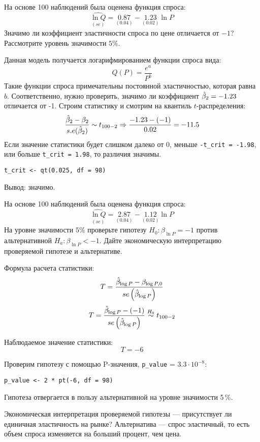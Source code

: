 \begin{problem} На основе 100 наблюдений была оценена функция спроса:
\[
\underset{(se)}{\widehat{\ln Q}} = \underset{(0.04)}{0.87} - \underset{(0.02)}{1.23}\ln P
\]
Значимо ли коэффициент эластичности спроса по цене отличается от $-1$? Рассмотрите уровень значимости $5\%$.


\begin{sol}
Данная модель получается логарифмированием функции спроса вида:
\[
Q(P) = \frac{e^a}{P^b}
\]
Такие функции спроса примечательны постоянной эластичностью, которая равна $b$. Соответственно, нужно проверить, значимо ли коэффициент $\hat{\beta}_2 = -1.23$ отличается от -1. Строим статистику и смотрим на квантиль $t$-распределения:
\[
\frac{\hat{\beta}_2-\beta_2}{s.e(\hat{\beta}_2)} \sim t_{100-2} \Rightarrow \frac{-1.23-(-1)}{0.02} = -11.5
\]
Если значение статистики будет слишком далеко от 0, меньше \verb|-t_crit = -1.98|, или больше  \verb|t_crit = 1.98|, то различия значимы.
\begin{verbatim}
t_crit <- qt(0.025, df = 98)
\end{verbatim}

Вывод: значимо.
\end{sol}
\end{problem}



\begin{problem}
На основе 100 наблюдений была оценена функция спроса:
\[
\underset{(se)}{\widehat{\ln Q}} = \underset{(0.04)}{2.87} - \underset{(0.02)}{1.12}\ln P
\]
На уровне значимости $5\%$ проверьте гипотезу  $H_0: \beta_{\ln P} = - 1$ против альтернативной $H_a: \beta_{\ln P} < -1$. Дайте экономическую интерпретацию проверяемой гипотезе и альтернативе.


\begin{sol}
Формула расчета статистики:
\[T = \frac{\hat{\beta}_{\log P} - \beta_{\log P, 0}}{se \left(\hat{\beta}_{\log P} \right)} \]
\[T = \frac{\hat{\beta}_{\log P} - (-1)}{se\left(\hat{\beta}_{\log P} \right)} \overset{H_0}{\sim} t_{100 -2} \]

Наблюдаемое значение статистики:
\[ T = -6    \]

Проверим гипотезу с помощью P-значения, \verb|p_value| = $3.3 \cdot 10^{-8}$:
\begin{verbatim}
p_value <- 2 * pt(-6, df = 98)
\end{verbatim}

Гипотеза отвергается в пользу альтернативной на уровне значимости 5\,\%.

Экономическая интерпретация проверяемой гипотезы — присутствует ли единичная эластичность на рынке? Альтернатива — спрос эластичный, то есть объем спроса изменяется на больший процент, чем цена.
\end{sol}
\end{problem}



